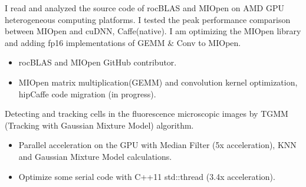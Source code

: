 \documentclass{resume}
\begin{document}
I read and analyzed the source code of rocBLAS and MIOpen on AMD GPU heterogeneous computing platforms. I tested the peak performance comparison between MIOpen and cuDNN, Caffe(native). I am optimizing the MIOpen library and adding fp16 implementations of GEMM \& Conv to MIOpen.
\begin{itemize}
    \item  rocBLAS and MIOpen GitHub contributor.
    \item MIOpen matrix multiplication(GEMM) and convolution kernel optimization, hipCaffe code migration (in progress).
\end{itemize}

Detecting and tracking cells in the fluorescence microscopic images by TGMM (Tracking with Gaussian Mixture Model) algorithm.
\begin{itemize}
    \item Parallel acceleration on the GPU with Median Filter (5x acceleration), KNN and Gaussian Mixture Model calculations.
    \item Optimize some serial code with C++11 std::thread (3.4x acceleration).
\end{itemize}
\end{document}
